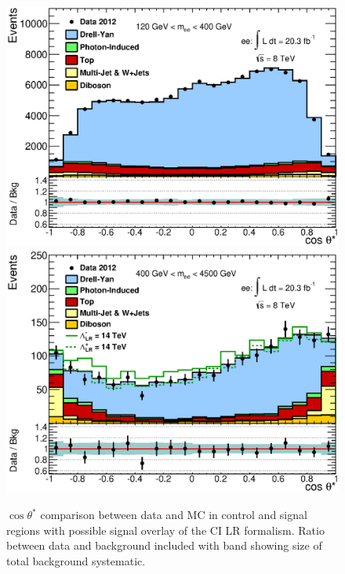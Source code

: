 	\begin{figure}[h]
	    \begin{center}
	    	\includegraphics[width=0.8\linewidth]{images/CosThetaStar_Control_main.eps} \\
	    	\includegraphics[width=0.8\linewidth]{images/CosThetaStar_Signal_main.eps}
	    \end{center}
	   \caption{$\cos{\theta^{*}}$ comparison between data and MC in control and signal regions with possible signal overlay of the CI LR formalism. Ratio between data and background included with band showing size of total background systematic.}
	   \label{fig:cosTS_main}
	\end{figure}

